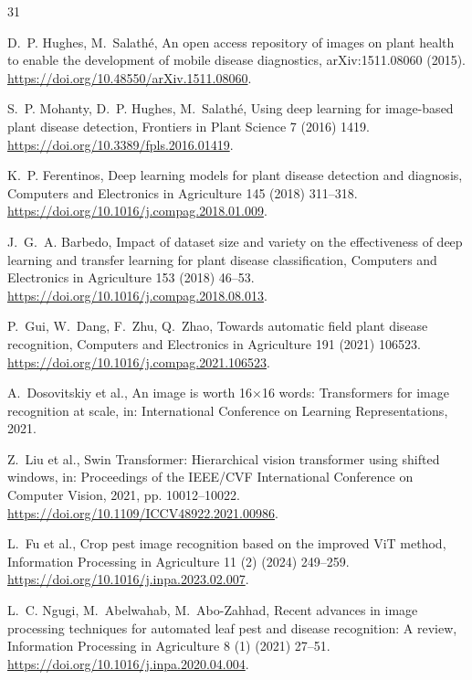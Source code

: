 \documentclass[preprint,12pt]{elsarticle}
\begin{document}

\begin{thebibliography}{31}

D.~P. Hughes, M.~Salath\'e, An open access repository of images on plant health
to enable the development of mobile disease diagnostics, arXiv:1511.08060
(2015). \url{https://doi.org/10.48550/arXiv.1511.08060}.

S.~P. Mohanty, D.~P. Hughes, M.~Salath\'e, Using deep learning for image-based
plant disease detection, Frontiers in Plant Science 7 (2016) 1419.
\url{https://doi.org/10.3389/fpls.2016.01419}.

K.~P. Ferentinos, Deep learning models for plant disease detection and
diagnosis, Computers and Electronics in Agriculture 145 (2018) 311--318.
\url{https://doi.org/10.1016/j.compag.2018.01.009}.

J.~G.~A. Barbedo, Impact of dataset size and variety on the effectiveness of
deep learning and transfer learning for plant disease classification,
Computers and Electronics in Agriculture 153 (2018) 46--53.
\url{https://doi.org/10.1016/j.compag.2018.08.013}.

P.~Gui, W.~Dang, F.~Zhu, Q.~Zhao, Towards automatic field plant disease
recognition, Computers and Electronics in Agriculture 191 (2021) 106523.
\url{https://doi.org/10.1016/j.compag.2021.106523}.

A.~Dosovitskiy et al., An image is worth 16$\times$16 words: Transformers for
image recognition at scale, in: International Conference on Learning
Representations, 2021.

Z.~Liu et al., Swin Transformer: Hierarchical vision transformer using shifted
windows, in: Proceedings of the IEEE/CVF International Conference on Computer
Vision, 2021, pp. 10012--10022.
\url{https://doi.org/10.1109/ICCV48922.2021.00986}.

L.~Fu et al., Crop pest image recognition based on the improved ViT method,
Information Processing in Agriculture 11 (2) (2024) 249--259.
\url{https://doi.org/10.1016/j.inpa.2023.02.007}.

L.~C. Ngugi, M.~Abelwahab, M.~Abo-Zahhad, Recent advances in image processing
techniques for automated leaf pest and disease recognition: A review,
Information Processing in Agriculture 8 (1) (2021) 27--51.
\url{https://doi.org/10.1016/j.inpa.2020.04.004}.


\end{thebibliography}
\end{document}
